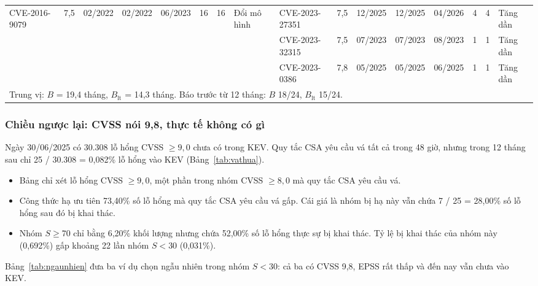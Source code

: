 \documentclass[conference]{IEEEtran}
\begin{document}
\begin{table}[t]
\begin{tabular}{lccccccl@{\hspace{1em}}lccccccl}
CVE-2016-9079 & 7,5 & 02/2022 & 02/2022 & 06/2023 & 16 & 16 & Đổi mô hình &
CVE-2023-27351 & 7,5 & 12/2025 & 12/2025 & 04/2026 & 4 & 4 & Tăng dần \\
 & & & & & & & &
CVE-2023-32315 & 7,5 & 07/2023 & 07/2023 & 08/2023 & 1 & 1 & Tăng dần \\
 & & & & & & & &
CVE-2023-0386 & 7,8 & 05/2025 & 05/2025 & 06/2025 & 1 & 1 & Tăng dần \\
\midrule
\multicolumn{16}{l}{Trung vị: $B$ = 19,4 tháng, $B_{\text{lt}}$ = 14,3 tháng. Báo trước từ 12 tháng: $B$ 18/24, $B_{\text{lt}}$ 15/24.} \\
\bottomrule
\end{tabular}
\end{table}

\subsubsection{Chiều ngược lại: CVSS nói 9,8, thực tế không có gì}
Ngày 30/06/2025 có 30.308 lỗ hổng CVSS $\ge 9{,}0$ chưa có trong KEV. Quy tắc CSA yêu cầu vá tất cả trong 48 giờ,
nhưng trong 12 tháng sau chỉ 25 / 30.308 = 0,082\% lỗ hổng vào KEV (Bảng~\ref{tab:vathua}).
\begin{itemize}
\item Bảng chỉ xét lỗ hổng CVSS $\ge 9{,}0$, một phần trong nhóm CVSS $\ge 8{,}0$ mà quy tắc CSA yêu cầu vá.
\item Công thức hạ ưu tiên 73,40\% số lỗ hổng mà quy tắc CSA yêu cầu vá gấp. Cái giá là nhóm bị hạ này vẫn chứa
7 / 25 = 28,00\% số lỗ hổng sau đó bị khai thác.
\item Nhóm $S \ge 70$ chỉ bằng 6,20\% khối lượng nhưng chứa 52,00\% số lỗ hổng thực sự bị khai thác. Tỷ lệ bị
khai thác của nhóm này (0,692\%) gấp khoảng 22 lần nhóm $S < 30$ (0,031\%).
\end{itemize}
Bảng~\ref{tab:ngaunhien} đưa ba ví dụ chọn ngẫu nhiên trong nhóm $S < 30$: cả ba có CVSS 9,8, EPSS rất thấp và
đến nay vẫn chưa vào KEV.
\end{document}
